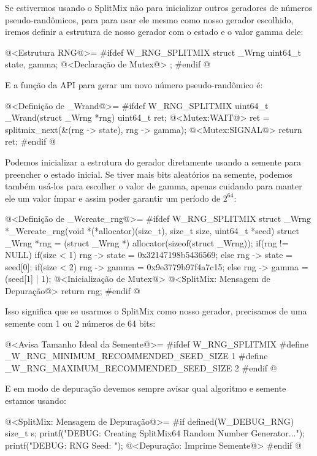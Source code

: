 Se estivermos usando o SplitMix não para inicializar outros geradores
de números pseudo-randômicos, para para usar ele mesmo como nosso
gerador escolhido, iremos definir a estrutura de nosso gerador com o
estado e o valor gamma dele:

\iniciocodigo
@<Estrutura RNG@>=
#ifdef W_RNG_SPLITMIX
struct _Wrng{
  uint64_t state, gamma;
  @<Declaração de Mutex@>
};
#endif
@
\fimcodigo

E a função da API para gerar um novo número pseudo-randômico é:

\iniciocodigo
@<Definição de \_Wrand@>=
#ifdef W_RNG_SPLITMIX
uint64_t _Wrand(struct _Wrng *rng){
  uint64_t ret;
  @<Mutex:WAIT@>
  ret = splitmix_next(&(rng -> state), rng -> gamma);
  @<Mutex:SIGNAL@>
  return ret;
}
#endif
@
\fimcodigo

Podemos inicializar a estrutura do gerador diretamente usando a
semente para preencher o estado inicial. Se tiver mais bits aleatórios
na semente, podemos também usá-los para escolher o valor de gamma,
apenas cuidando para manter ele um valor ímpar e assim poder garantir
um período de $2^{64}$:

\iniciocodigo
@<Definição de \_Wcreate\_rng@>=
#ifdef W_RNG_SPLITMIX
struct _Wrng *_Wcreate_rng(void *(*allocator)(size_t), size_t size,
                           uint64_t *seed){
  struct _Wrng *rng = (struct _Wrng *) allocator(sizeof(struct _Wrng));
  if(rng != NULL){
    if(size < 1)
      rng -> state = 0x32147198b5436569;
    else
      rng -> state = seed[0];
    if(size < 2)
      rng -> gamma = 0x9e3779b97f4a7c15;
    else
      rng -> gamma = (seed[1] | 1);
    @<Inicialização de Mutex@>
    @<SplitMix: Mensagem de Depuração@>
  }
  return rng;
}
#endif
@
\fimcodigo

Isso significa que se usarmos o SplitMix como nosso gerador,
precisamos de uma semente com 1 ou 2 números de 64 bits:

\iniciocodigo
@<Avisa Tamanho Ideal da Semente@>=
#ifdef W_RNG_SPLITMIX
#define _W_RNG_MINIMUM_RECOMMENDED_SEED_SIZE  1
#define _W_RNG_MAXIMUM_RECOMMENDED_SEED_SIZE  2
#endif
@
\fimcodigo

E em modo de depuração devemos sempre avisar qual algoritmo e semente
estamos usando:

\iniciocodigo
@<SplitMix: Mensagem de Depuração@>=
#if defined(W_DEBUG_RNG)
{
  size_t s;
  printf("DEBUG: Creating SplitMix64 Random Number Generator...");
  printf("DEBUG: RNG Seed: ");
  @<Depuração: Imprime Semente@>
}
#endif
@
\fimcodigo


